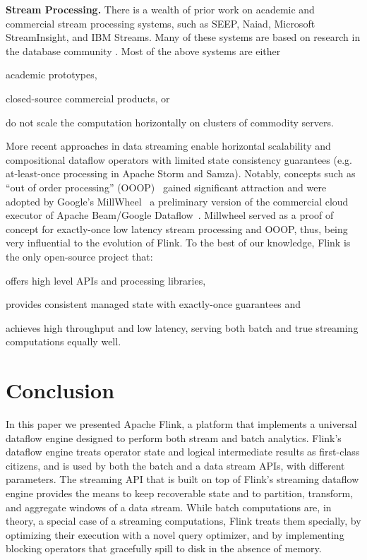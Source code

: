 \documentclass[11pt]{article}
\newcommand{\para}[1]{\vspace{2mm}\noindent\textbf{#1}}
\begin{document}
\para{Stream Processing.} There is a wealth of prior work on academic and commercial stream processing systems, such as SEEP, Naiad, Microsoft StreamInsight, and IBM Streams. Many of these systems are based on research in the database community \cite{chandrasekaran2003psoup,abadi2005design,arasu2004stream,chandramouli2014trill,gedik2008spade,migliavacca2010seep,murray2013naiad}. Most of the above systems are either
\begin{inparaenum}[i)]
  \item academic prototypes,
  \item closed-source commercial products, or 
  \item do not scale the computation horizontally on clusters of commodity servers.
\end{inparaenum}
More recent approaches in data streaming enable horizontal scalability and compositional dataflow operators with limited state consistency guarantees (e.g. at-least-once processing in Apache Storm and Samza). Notably, concepts such as ``out of order processing'' (OOOP)~\cite{li2008out} gained significant attraction and were adopted by Google's MillWheel~\cite{akidau2013millwheel} a preliminary version of the commercial cloud executor of Apache Beam/Google Dataflow~\cite{akidau2015dataflow}. Millwheel served as a proof of concept for exactly-once low latency stream processing and OOOP, thus, being very influential to the evolution of Flink. To the best of our knowledge, Flink is the only open-source project that:
\begin{inparaenum}[i)]
  \item offers high level APIs and processing libraries,
  \item provides consistent managed state with exactly-once guarantees and
  \item achieves high throughput and low latency, serving both batch and true streaming computations equally well.
\end{inparaenum}

\vspace{-3mm}
\section{Conclusion}
\label{sec:conclusions}
In this paper we presented Apache Flink, a platform that implements a universal dataflow engine designed to perform both stream and batch analytics. Flink's dataflow engine treats operator state and logical intermediate results as first-class citizens, and is used by both the batch and a data stream APIs, with different parameters. The streaming API that is built on top of  Flink's streaming dataflow engine provides the means to keep recoverable state and to partition, transform, and aggregate windows of a data stream. While batch computations are, in theory, a special case of a streaming computations, Flink treats them specially, by optimizing their execution with a novel query optimizer, and by implementing blocking operators that gracefully spill to disk in the absence of memory. 

{
\small


}
\end{document}
